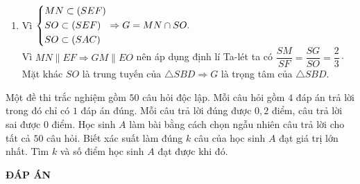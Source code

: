 \begin{bt}
{\begin{enumerate}
$\Rightarrow (SAB)\cap (SBC)=d\parallel CD\parallel AB$ với $d$ là đường thẳng đi qua $S$.\\
 Mặt khác $\heva{& I\in BM\subset (SAB)\\& I\in CN\subset (SCD)}\Rightarrow SI=(SAB)\cap (SCD)$\\
 Từ đó $SI\parallel AB\parallel CD$.\\
 Khi đó theo định lý Ta-lét ta có $\dfrac{SI}{FC}=\dfrac{SN}{NF}$\\
Mà $N$ là trọng tâm của $\triangle SCD$ nên $\dfrac{SN}{NF}=2\Rightarrow\dfrac{SI}{FC}=2=\dfrac{SI}{\dfrac{CD}{2}}=\dfrac{2SI}{CD}\Rightarrow\dfrac{SI}{CD}=1\cdot$
\item Vì $\left\{\begin{aligned}& MN\subset (SEF)\\& SO\subset (SEF)\\& SO\subset (SAC)\end{aligned}\right.\Rightarrow G=MN\cap SO.$\\
Vì $MN\parallel EF\Rightarrow GM\parallel EO$ nên áp dụng định lí Ta-lét ta có $\dfrac{SM}{SF}=\dfrac{SG}{SO}=\dfrac{2}{3}\cdot$\\
Mặt khác $SO$ là trung tuyến của $\triangle SBD\Rightarrow G$ là trọng tâm của $\triangle SBD.$
\end{enumerate}
}
\end{bt}

\begin{bt}%
Một đề thi trắc nghiệm gồm $50$ câu hỏi độc lập. Mỗi câu hỏi gồm $4$ đáp án trả lời trong đó chỉ có $1$ đáp án đúng. Mỗi câu trả lời đúng được $0{,}2$ điểm, câu trả lời sai được $0$ điểm. Học sinh $A$ làm bài bằng cách chọn ngẫu nhiên câu trả lời cho tất cả $50$ câu hỏi. Biết xác suất làm đúng $k$ câu của học sinh $A$ đạt giá trị lớn nhất. Tìm $k$ và số điểm học sinh $A$ đạt được khi đó.
\end{bt}




\newpage
\begin{center}
	\textbf{ĐÁP ÁN}
\end{center}
\begin{multicols}{10}
	
\end{multicols}

